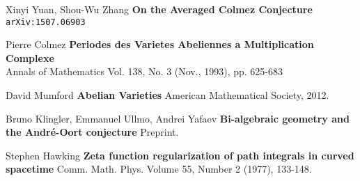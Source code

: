 \documentclass[12pt]{article}
\begin{document}
\selectfont \fontsize{12}{10}\selectfont


\begin{thebibliography}{}

\item Xinyi Yuan, Shou-Wu Zhang \textbf{On the Averaged Colmez Conjecture} \texttt{arXiv:1507.06903}

\item Pierre Colmez \textbf{Periodes des Varietes Abeliennes a Multiplication Complexe} \\ Annals of Mathematics Vol. 138, No. 3 (Nov., 1993), pp. 625-683

\item David Mumford \textbf{Abelian Varieties} American Mathematical Society, 2012.

\item Bruno Klingler, Emmanuel Ullmo, Andrei Yafaev
\textbf{Bi-algebraic geometry and the André-Oort conjecture} Preprint.

\item Stephen Hawking \textbf{Zeta function regularization of path integrals in curved spacetime} Comm. Math. Phys.
Volume 55, Number 2 (1977), 133-148.

\end{thebibliography}
\end{document}

